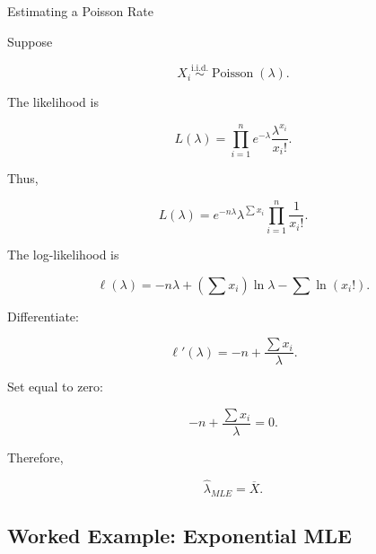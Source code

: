 \begin{workedexamplebox}{Estimating a Poisson Rate}

Suppose

\[
X_i
\overset{\text{i.i.d.}}{\sim}
\operatorname{Poisson}(\lambda).
\]

The likelihood is

\[
L(\lambda)
=
\prod_{i=1}^{n}
e^{-\lambda}
\frac{\lambda^{x_i}}{x_i!}.
\]

Thus,

\[
L(\lambda)
=
e^{-n\lambda}
\lambda^{\sum x_i}
\prod_{i=1}^{n}
\frac1{x_i!}.
\]

The log-likelihood is

\[
\ell(\lambda)
=
-n\lambda
+
\left(
\sum x_i
\right)
\ln\lambda
-
\sum\ln(x_i!).
\]

Differentiate:

\[
\ell'(\lambda)
=
-n
+
\frac{
\sum x_i
}{
\lambda
}.
\]

Set equal to zero:

\[
-n
+
\frac{
\sum x_i
}{
\lambda
}
=
0.
\]

Therefore,

\begin{answerbox}
\[
\boxed{
\widehat{\lambda}_{MLE}
=
\overline{X}.
}
\]
\end{answerbox}

\end{workedexamplebox}

\subsection{Worked Example: Exponential MLE}
\label{subsec:worked-exponential-mle}

